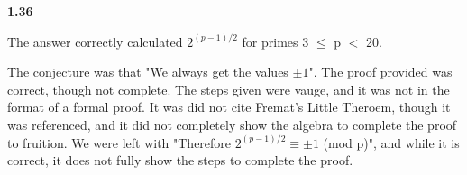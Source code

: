 \documentclass[12pt]{article}
\begin{document}
 \begin{center}
    \Large\textbf{1.36}
 \end{center}
 
 \begin{center}
 \end{center}
 
 The answer correctly calculated $2^{(p-1)/2}$ for primes 3 $\leq$ p $<$ 20.
 
 The conjecture was that "We always get the values $\pm1$".
 The proof provided was correct, though not complete. The steps given were vauge, and it was not in the format of a formal proof. It was did not cite Fremat's Little Theroem, though it was referenced, and it did not completely show the algebra to complete the proof to fruition. We were left with "Therefore $2^{(p-1)/2} \equiv \pm1$ (mod p)", and while it is correct, it does not fully show the steps to complete the proof.
\end{document}
